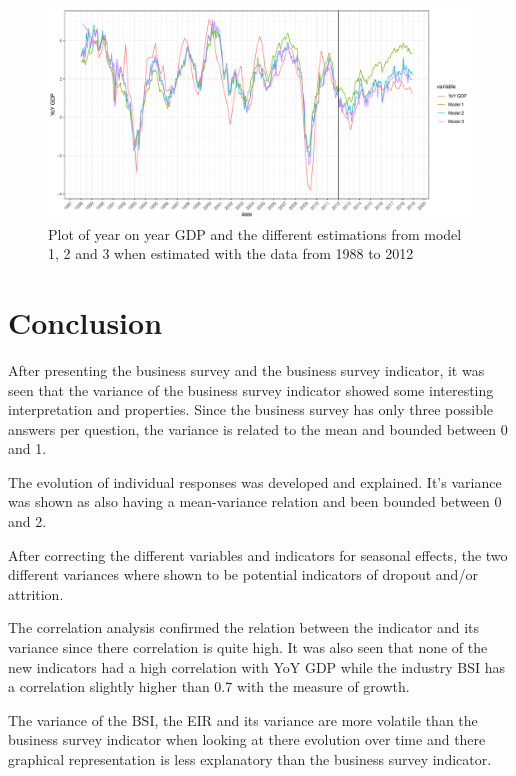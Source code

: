 \documentclass[12pt,a4paper,oneside]{book}
\begin{document}
\begin{figure}[H]
    \centering
    \includegraphics[scale=0.5]{Graphs/predictions3.pdf}
    \caption{Plot of year on year GDP and the different estimations from model 1, 2 and 3 when estimated with the data from 1988 to 2012}
    \label{fig:predictions3}
\end{figure}




\chapter{Conclusion}

After presenting the business survey and the business survey indicator, it was seen that the variance of the business survey indicator showed some interesting interpretation and properties. 
Since the business survey has only three possible answers per question, the variance is related to the mean and bounded between 0 and 1.

The evolution of individual responses was developed and explained.
It's variance was shown as also having a mean-variance relation and been bounded between 0 and 2.

After correcting the different variables and indicators for seasonal effects, the two different variances where shown to be potential indicators of dropout and/or attrition.

The correlation analysis confirmed the relation between the indicator and its variance since there correlation is quite high. 
It was also seen that none of the new indicators had a high correlation with YoY GDP while the industry BSI has a correlation slightly higher than 0.7 with the measure of growth.

The variance of the BSI, the EIR and its variance are more volatile than the business survey indicator when looking at there evolution over time and there graphical representation is less explanatory than the business survey indicator.
\end{document}
